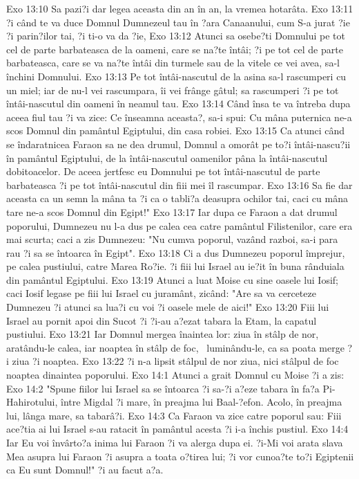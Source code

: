 Exo 13:10  Sa pazi?i dar legea aceasta din an în an, la vremea hotarâta.
Exo 13:11  ?i când te va duce Domnul Dumnezeul tau în ?ara Canaanului, cum S-a jurat ?ie ?i parin?ilor tai, ?i ti-o va da ?ie,
Exo 13:12  Atunci sa osebe?ti Domnului pe tot cel de parte barbateasca de la oameni, care se na?te întâi; ?i pe tot cel de parte barbateasca, care se va na?te întâi din turmele sau de la vitele ce vei avea, sa-l închini Domnului.
Exo 13:13  Pe tot întâi-nascutul de la asina sa-l rascumperi cu un miel; iar de nu-l vei rascumpara, îi vei frânge gâtul; sa rascumperi ?i pe tot întâi-nascutul din oameni în neamul tau.
Exo 13:14  Când însa te va întreba dupa aceea fiul tau ?i va zice: Ce înseamna aceasta?, sa-i spui: Cu mâna puternica ne-a scos Domnul din pamântul Egiptului, din casa robiei.
Exo 13:15  Ca atunci când se îndaratnicea Faraon sa ne dea drumul, Domnul a omorât pe to?i întâi-nascu?ii în pamântul Egiptului, de la întâi-nascutul oamenilor pâna la întâi-nascutul dobitoacelor. De aceea jertfesc eu Domnului pe tot întâi-nascutul de parte barbateasca ?i pe tot întâi-nascutul din fiii mei îl rascumpar.
Exo 13:16  Sa fie dar aceasta ca un semn la mâna ta ?i ca o tabli?a deasupra ochilor tai, caci cu mâna tare ne-a scos Domnul din Egipt!"
Exo 13:17  Iar dupa ce Faraon a dat drumul poporului, Dumnezeu nu l-a dus pe calea cea catre pamântul Filistenilor, care era mai scurta; caci a zis Dumnezeu: "Nu cumva poporul, vazând razboi, sa-i para rau ?i sa se întoarca în Egipt".
Exo 13:18  Ci a dus Dumnezeu poporul împrejur, pe calea pustiului, catre Marea Ro?ie. ?i fiii lui Israel au ie?it în buna rânduiala din pamântul Egiptului.
Exo 13:19  Atunci a luat Moise cu sine oasele lui Iosif; caci Iosif legase pe fiii lui Israel cu juramânt, zicând: "Are sa va cerceteze Dumnezeu ?i atunci sa lua?i cu voi ?i oasele mele de aici!"
Exo 13:20  Fiii lui Israel au pornit apoi din Sucot ?i ?i-au a?ezat tabara la Etam, la capatul pustiului.
Exo 13:21  Iar Domnul mergea înaintea lor: ziua în stâlp de nor, aratându-le calea, iar noaptea în stâlp de foc,  luminându-le, ca sa poata merge ?i ziua ?i noaptea.
Exo 13:22  ?i n-a lipsit stâlpul de nor ziua, nici stâlpul de foc noaptea dinaintea poporului.
Exo 14:1  Atunci a grait Domnul cu Moise ?i a zis:
Exo 14:2  "Spune fiilor lui Israel sa se întoarca ?i sa-?i a?eze tabara în fa?a Pi-Hahirotului, între Migdal ?i mare, în preajma lui Baal-?efon. Acolo, în preajma lui, lânga mare, sa tabarâ?i.
Exo 14:3  Ca Faraon va zice catre poporul sau: Fiii ace?tia ai lui Israel s-au ratacit în pamântul acesta ?i i-a închis pustiul.
Exo 14:4  Iar Eu voi învârto?a inima lui Faraon ?i va alerga dupa ei. ?i-Mi voi arata slava Mea asupra lui Faraon ?i asupra a toata o?tirea lui; ?i vor cunoa?te to?i Egiptenii ca Eu sunt Domnul!" ?i au facut a?a.
